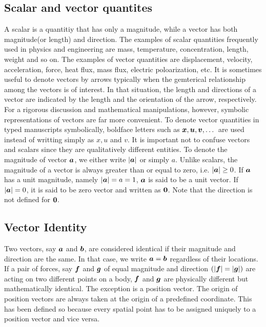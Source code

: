 \documentclass[10pt,a4j]{jarticle}
\begin{document}
\subsection{Scalar and vector quantites}
A scalar is a quantitiy that has only a magnitude, while a vector has 
both magnitude(or length) and direction.
The examples of scalar quantities frequently used in physics and engineering 
are mass, temperature, concentration, length, weight and so on.
The examples of vector quantities are displacement, velocity, acceleration, 
force, heat flux, mass flux, electric poloarization, etc. 
It is sometimes useful to denote vectors by arrows typically when 
the gemterical relationship among the vectors is of interest.
In that situation, the length and directions of a vector 
are indicated by the length and the orientation of the arrow, respectively.
For a rigorous discussion and mathematical manipulations, however, symbolic 
representations of vectors are far more convenient. 
To denote vector quantities in typed manuscripts symbolically, boldface letters such 
as $\mbox{\boldmath $x$},\mbox{\boldmath $u$},\mbox{\boldmath $v$},\dots$ are used instead of writting simply as $x, u$ and $v$.
It is important not to confuse vectors and scalars since they are qualitatively different entities.
To denote the magnitude of vector $\mbox{\boldmath $a$}$, we either write $|\mbox{\boldmath $a$}|$ or simply $a$.
Unlike scalars, the magnitude of a vector is always greater than or equal to zero, i.e. $|\mbox{\boldmath $a$}| \geq 0$.
If $\mbox{\boldmath $a$}$ has a unit magnitude, namely $|\mbox{\boldmath $a$}|=a=1$, 
$\mbox{\boldmath $a$}$ is said to be a unit vector. If $|\mbox{\boldmath $a$}|=0$, it is said to be zero vector and written as 
$\mbox{\boldmath $0$}$. Note that the direction is not defined for $\mbox{\boldmath $0$}$. 
\subsection{Vector Identity}
Two vectors, say $\mbox{\boldmath $a$}$ and $\mbox{\boldmath $b$}$, are considered identical 
if their magnitude and direction are the same. 
In that case, we write $\mbox{\boldmath $a$}=\mbox{\boldmath $b$}$ regardless of their locations. 
If a pair of forces, say $\mbox{\boldmath $f$}$ and $\mbox{\boldmath $g$}$ of equal magnitude and 
direction $(|\mbox{\boldmath $f$}|=|\mbox{\boldmath $g$}|)$ are acting on two different points 
on a body, $\mbox{\boldmath $f$}$ and $\mbox{\boldmath $g$}$ are physically different but 
mathematically identical. 
The exception is a position vector. The origin of position vectors are always taken at 
the origin of a predefined coordinate.
This has been defined so because every spatial point has to be assigned uniquely to a position vector and 
vice versa.
\end{document}

